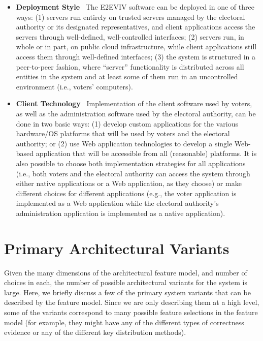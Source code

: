 \begin{itemize}
\item \textbf{Deployment Style} \ The E2EVIV software can be deployed
  in one of three ways: (1) servers run entirely on trusted servers
  managed by the electoral authority or its designated
  representatives, and client applications access the servers through
  well-defined, well-controlled interfaces; (2) servers run, in whole
  or in part, on public cloud infrastructure, while client applications
  still access them through well-defined interfaces; (3) the system is
  structured in a peer-to-peer fashion, where ``server'' functionality
  is distributed across all entities in the system and at least some
  of them run in an uncontrolled environment (i.e., voters'
  computers). 

\item \textbf{Client Technology} \ Implementation of the client
  software used by voters, as well as the administration software used
  by the electoral authority, can be done in two basic ways: (1)
  develop custom applications for the various hardware/OS platforms
  that will be used by voters and the electoral authority; or (2) use
  Web application technologies to develop a single Web-based
  application that will be accessible from all (reasonable)
  platforms. It is also possible to choose both implementation
  strategies for all applications (i.e., both voters and the electoral
  authority can access the system through either native applications
  or a Web application, as they choose) or make different choices for
  different applications (e.g., the voter application is implemented
  as a Web application while the electoral authority's administration
  application is implemented as a native application).

\end{itemize}

\section{Primary Architectural Variants}

Given the many dimensions of the architectural feature model, and
number of choices in each, the number of possible architectural
variants for the system is large. Here, we briefly discuss a few of
the primary system variants that can be described by the feature
model. Since we are only describing them at a high level, some of the
variants correspond to many possible feature selections in the feature
model (for example, they might have any of the different types of
correctness evidence or any of the different key distribution
methods).

